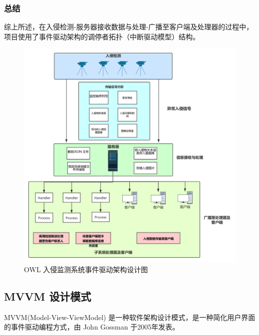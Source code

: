 \documentclass[article]{BJTU-thesis}
\begin{document}
\subsubsection{总结}
综上所述，在入侵检测-服务器接收数据与处理-广播至客户端及处理器的过程中，项目使用了事件驱动架构的调停者拓扑（中断驱动模型）结构。
\begin{figure}[!htbp]
	\centering
	\includegraphics[scale=.2]{img/t6.png}
	\caption{OWL 入侵监测系统事件驱动架构设计图}
\end{figure}

\subsection{MVVM 设计模式}
MVVM(Model-View-ViewModel) 是一种软件架构设计模式，是一种简化用户界面的事件驱动编程方式，由 John Gossman 于2005年发表。
\end{document}
